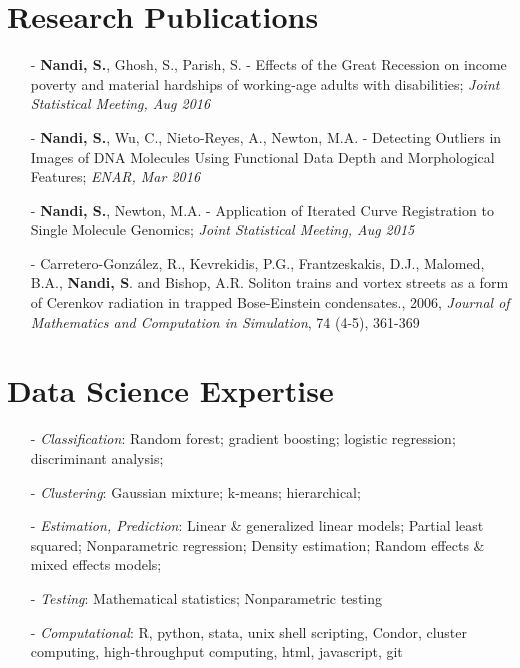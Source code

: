 \documentclass[11pt]{res} %
\begin{document}
\begin{resume}
\section{Research Publications} 
\begin{itemize}[leftmargin=*]
\item[-] {\bf{Nandi, S.}}, Ghosh, S., Parish, S. - Effects of the Great Recession on income poverty and material hardships of working-age adults with disabilities; {\emph{Joint Statistical Meeting, Aug 2016}}
\item[-] {\bf{Nandi, S.}}, Wu, C., Nieto-Reyes, A., Newton, M.A. - Detecting Outliers in Images of DNA Molecules Using Functional Data Depth and Morphological Features; {\emph{ENAR, Mar 2016}}
\item[-] {\bf{Nandi, S.}}, Newton, M.A. - Application of Iterated Curve Registration to Single
Molecule Genomics; {\emph{Joint Statistical Meeting, Aug 2015}}
\item[-] Carretero-González, R., Kevrekidis, P.G., Frantzeskakis, D.J., Malomed, B.A., {\bf{Nandi, S}}. and Bishop, A.R. Soliton trains and vortex streets as a form of Cerenkov radiation in trapped
Bose-Einstein condensates., 2006, {\emph{Journal of Mathematics and Computation in Simulation}}, 74 (4-5), 361-369
\end{itemize}

\section{Data Science Expertise} 
\begin{itemize}[leftmargin=*]
\item[-] {\emph{Classification}}: Random forest; gradient boosting; logistic regression; discriminant analysis;
\item[-] {\emph{Clustering}}: Gaussian mixture; k-means; hierarchical; 
\item[-] {\emph{Estimation, Prediction}}: Linear \& generalized linear models; Partial least squared; Nonparametric regression; Density estimation; Random effects \& mixed effects models; 
\item[-] {\emph{Testing}}: Mathematical statistics; Nonparametric testing
\item[-] {\emph{Computational}}: R, python, stata, unix shell scripting, Condor, cluster computing, high-throughput computing, html, javascript, git
\end{itemize}


\end{resume}
\end{document}
